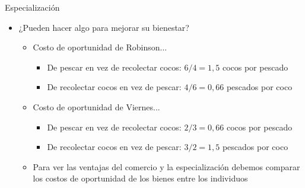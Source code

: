 \documentclass{beamer}
\begin{document}
\begin{frame}{Especialización}
    \begin{itemize}
        \item ¿Pueden hacer algo para mejorar su bienestar? 

        \begin{itemize}
            \item Costo de oportunidad de Robinson...
                \begin{itemize}
                \item De pescar en vez de recolectar cocos: $ 6/4 = 1,5 $ cocos por pescado 
                \item De recolectar cocos en vez de pescar: $ 4/6 =0,66 $ pescados por coco
                \end{itemize}
            \item Costo de oportunidad de Viernes...
                \begin{itemize}
                \item De pescar en vez de recolectar cocos: $ 2/3 = 0,66 $ cocos por pescado
                \item De recolectar cocos en vez de pescar: $ 3/2 = 1,5 $ pescados por coco
                \end{itemize}
            \item Para ver las ventajas del comercio y la especialización debemos comparar los costos de oportunidad de los bienes entre los individuos
        \end{itemize}
    \end{itemize}
\end{frame}
\end{document}
